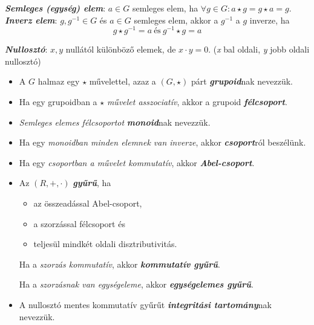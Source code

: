 \documentclass[12pt,margin=0px]{article}
\begin{document}
        \noindent \emph{\textbf{Semleges (egység) elem}}: $a \in G$ semleges elem, ha $\forall g \in G : a \star g = g \star a = g$.\\

        \noindent \emph{\textbf{Inverz elem}}: $g,g^{-1} \in G$ és $a\in G$ semleges elem, akkor a $g^{-1}$ a $g$ inverze, ha
        \[
            g\star g^{-1} = a\ \text{és}\ g^{-1} \star g = a
        \]

        \noindent \emph{\textbf{Nullosztó}}: $x,y$ nullától különböző elemek, de $x\cdot y = 0$.
            (\emph{x} bal oldali, \emph{y} jobb oldali nullosztó)

        \begin{itemize}[leftmargin=5.5mm]
            \renewcommand{\labelitemi}{$\vcenter{\hbox{\tiny$\bullet$}}$}
            \item A	$G$ halmaz egy $\star$ művelettel, azaz a $(G, \star)$ párt \emph{\textbf{grupoid}}nak nevezzük.
            \item Ha egy grupoidban a $\star$ \emph{művelet asszociatív}, akkor a grupoid \emph{\textbf{félcsoport}}.
            \item \emph{Semleges elemes félcsoportot} \emph{\textbf{monoid}}nak nevezzük.
            \item Ha egy \emph{monoidban minden elemnek van inverze}, akkor \emph{\textbf{csoport}}ról beszélünk.
            \item Ha egy \emph{csoportban a művelet kommutatív}, akkor \emph{\textbf{Abel-csoport}}.
            \item Az $(R,+,\cdot)$ \emph{\textbf{gyűrű}}, ha
            \begin{itemize}
                \item az összeadással Abel-csoport,
                \item a szorzással félcsoport és
                \item teljesül mindkét oldali disztributivitás.
            \end{itemize}
            	
            Ha a \emph{szorzás kommutatív}, akkor \textbf{\emph{kommutatív gyűrű}}.
            	
            Ha a \emph{szorzásnak van egységeleme}, akkor \emph{\textbf{egységelemes gyűrű}}.
            \item A nullosztó mentes kommutatív gyűrűt \emph{\textbf{integritási tartomány}}nak nevezzük.
            	

\end{itemize}
\end{document}
